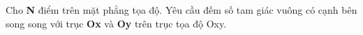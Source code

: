 Cho \textbf{ N } điểm trên mặt phẳng tọa độ. Yêu cầu đếm số tam giác vuông có cạnh bên song song với trục \textbf{ Ox } và \textbf{ Oy } trên trục tọa độ Oxy.